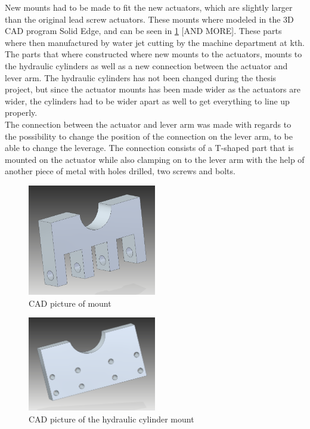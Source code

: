 \documentclass[a4paper,11pt]{kth-mag}
\begin{document}
New mounts had to be made to fit the new actuators, which are slightly larger than the original lead screw actuators. These mounts where modeled in the 3D CAD program Solid Edge, and can be seen in \ref{fig:CAD_Actuator_mount} [AND MORE]. These parts where then manufactured by water jet cutting by the machine department at \gls{kth}. The parts that where constructed where new mounts to the actuators, mounts to the hydraulic cylinders as well as a new connection between the actuator and lever arm. The hydraulic cylinders has not been changed during the thesis project, but since the actuator mounts has been made wider as the actuators are wider, the cylinders had to be wider apart as well to get everything to line up properly. \\

The connection between the actuator and lever arm was made with regards to the possibility to change the position of the connection on the lever arm, to be able to change the leverage. The connection consists of a T-shaped part that is mounted on the actuator while also clamping on to the lever arm with the help of another piece of metal with holes drilled, two screws and bolts. \\

\begin{figure}[h]
\centering
\includegraphics[width=0.5\textwidth]{Actuator_mount}
\caption{CAD picture of mount}
\label{fig:CAD_Actuator_mount}
\end{figure}

\begin{figure}[h]
\centering
\includegraphics[width=0.5\textwidth]{Hydraulic_cylinder_mount}
\caption{CAD picture of the hydraulic cylinder mount}
\label{fig:CAD_Hydraulic_cylinder_mount}
\end{figure}
\end{document}
